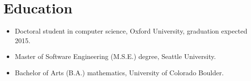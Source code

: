 \section*{Education}
\vspace{-2mm}

\begin{itemize}
    \item Doctoral student in computer science, Oxford University,
        graduation expected 2015.\vspace{-1mm}
	\item Master of Software Engineering (M.S.E.) degree, Seattle University.\vspace{-1mm}
	\item Bachelor of Arts (B.A.) mathematics, University of Colorado Boulder.
\end{itemize}

